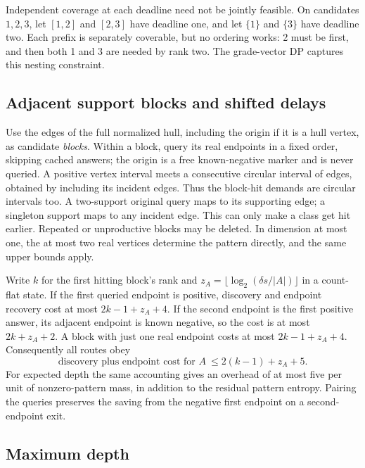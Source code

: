 Independent coverage at each deadline need not be jointly feasible.
On candidates $1,2,3$, let $[1,2]$ and $[2,3]$ have deadline one,
and let $\{1\}$ and $\{3\}$ have deadline two. Each prefix is
separately coverable, but no ordering works: 2 must be first, and then
both 1 and 3 are needed by rank two. The grade-vector DP captures this
nesting constraint.



\subsection{Adjacent support blocks and shifted delays}

Use the edges of the full normalized hull, including the origin if
it is a hull vertex, as candidate \emph{blocks}. Within a block,
query its real endpoints in a fixed order, skipping cached answers;
the origin is a free known-negative marker and is never queried.
A positive vertex interval meets a consecutive circular interval of
edges, obtained by including its incident edges. Thus the block-hit
demands are circular intervals too. A two-support original query
maps to its supporting edge; a singleton support maps to any incident
edge. This can only make a class get hit earlier. Repeated or
unproductive blocks may be deleted. In dimension at most one, the
at most two real vertices determine the pattern directly, and the
same upper bounds apply.

Write $k$ for the first hitting block's rank and
$z_A=\lfloor\log_2(\delta s/|A|)\rfloor$ in a count-flat state.
If the first queried endpoint is positive, discovery and endpoint
recovery cost at most $2k-1+z_A+4$.
If the second endpoint is the first positive answer, its adjacent
endpoint is known negative, so the cost is at most $2k+z_A+2$.
A block with just one real endpoint costs at most $2k-1+z_A+4$.
Consequently all routes obey
\begin{equation}\label{eq:qp-block-allowance}
 \text{discovery plus endpoint cost for }A\ \le 2(k-1)+z_A+5.
\end{equation}
For expected depth the same accounting gives an overhead of at most
five per unit of nonzero-pattern mass, in addition to the residual
pattern entropy. Pairing the queries preserves the saving from the
negative first endpoint on a second-endpoint exit.



\subsection{Maximum depth}

